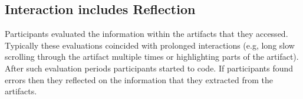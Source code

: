 






\subsection{Interaction includes Reflection}


Participants evaluated the information within the artifacts that they accessed. Typically these evaluations coincided with prolonged interactions (e.g, long slow scrolling through the artifact multiple times or highlighting parts of the artifact). After such evaluation periods participants started to code. If participants found errors then they reflected on the information that they extracted from the artifacts.

